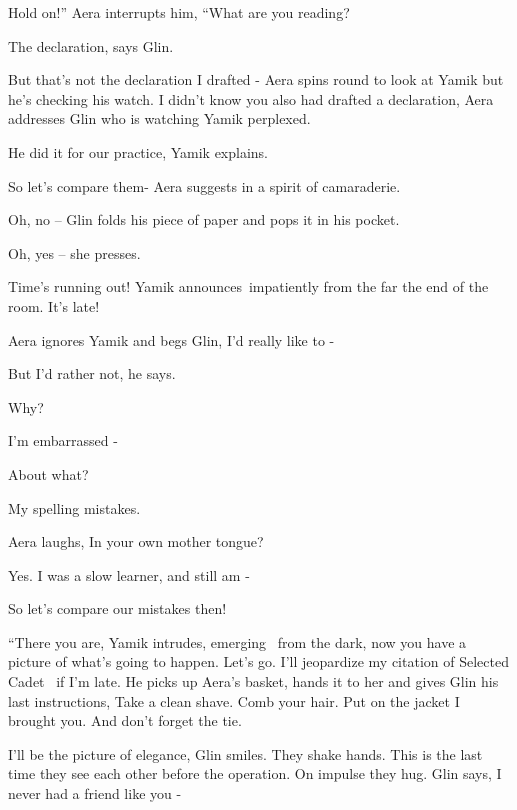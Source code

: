 \documentclass[12pt]{book}
\begin{document}
{\textquotedbl}Hold on!'' Aera interrupts him, ``What are you reading?{\textquotedbl}

{\textquotedbl}The declaration,{\textquotedbl} says Glin.

{\textquotedbl}But that's not the declaration I drafted -{\textquotedbl} Aera spins round to look at Yamik but he's
checking his watch. {\textquotedbl}I didn't know you also had drafted a declaration,{\textquotedbl} Aera addresses Glin
who is watching Yamik perplexed.

{\textquotedbl}He did it for our practice,{\textquotedbl} Yamik explains.

{\textquotedbl}So let's compare them-{\textquotedbl} Aera suggests in a spirit of camaraderie.

{\textquotedbl}Oh, no --{\textquotedbl} Glin folds his piece of paper and pops it in his pocket.

{\textquotedbl}Oh, yes --{\textquotedbl} she presses.

{\textquotedbl}Time's running out!{\textquotedbl} Yamik announces~impatiently from the far the end of the room.
{\textquotedbl}It's late!{\textquotedbl}

Aera ignores Yamik and begs Glin, {\textquotedbl}I'd really like to -{\textquotedbl}

{\textquotedbl}But I'd rather not,{\textquotedbl} he says.

{\textquotedbl}Why?{\textquotedbl}

{\textquotedbl}I'm embarrassed -{\textquotedbl}

{\textquotedbl}About what?{\textquotedbl}~

{\textquotedbl}My spelling mistakes.{\textquotedbl}

Aera laughs, {\textquotedbl}In your own mother tongue?{\textquotedbl}

{\textquotedbl}Yes. I was a slow learner, and still am -{\textquotedbl}

{\textquotedbl}So let's compare our mistakes then!{\textquotedbl}

{}``There you are,{\textquotedbl} Yamik intrudes, emerging \ from the dark, {\textquotedbl}now you have a picture of
what's going to happen. Let's go. I'll jeopardize my citation of Selected Cadet \ if I'm late.{\textquotedbl} He picks
up Aera's basket, hands it to her and gives Glin his last instructions, {\textquotedbl}Take a clean shave. Comb your
hair. Put on the jacket I brought you. And don't forget the tie.{\textquotedbl}

{\textquotedbl}I'll be the picture of elegance,{\textquotedbl} Glin smiles. They shake hands. This is the last time they
see each other before the operation. On impulse they hug. Glin says, {\textquotedbl}I never had a friend like you
-{\textquotedbl}
\end{document}
